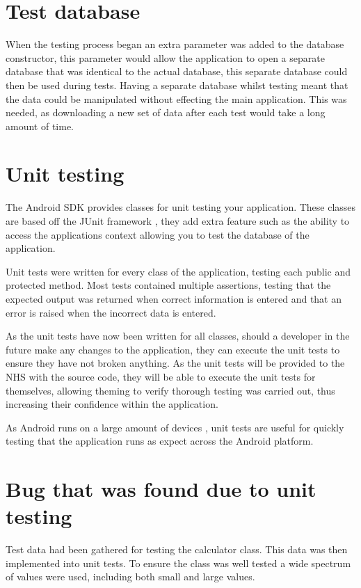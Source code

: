 \section{Test database}

When the testing process began an extra parameter was added to the database constructor, this parameter would allow the application to open a separate database that was identical to the actual database, this separate database could then be used during tests. Having a separate database whilst testing meant that the data could be manipulated without effecting the main application. This was needed, as downloading a new set of data after each test would take a long amount of time.

\section{Unit testing}

The Android SDK \cite{android_sdk} provides classes for unit testing your application. These classes are based off the JUnit framework \cite{junit}, they add extra feature such as the ability to access the applications context allowing you to test the database of the application.

Unit tests \cite{junit} were written for every class of the application, testing each public and protected method. Most tests contained multiple assertions, testing that the expected output was returned when correct information is entered and that an error is raised when the incorrect data is entered.

As the unit tests have now been written for all classes, should a developer in the future make any changes to the application, they can execute the unit tests to ensure they have not broken anything. As the unit tests will be provided to the NHS with the source code, they will be able to execute the unit tests for themselves, allowing theming to verify thorough testing was carried out, thus increasing their confidence within the application.

As Android runs on a large amount of devices \cite{phone_market}, unit tests are useful for quickly testing that the application runs as expect across the Android platform. 


\section{Bug that was found due to unit testing}

Test data had been gathered for testing the calculator class. This data was then implemented into unit tests. To ensure the class was well tested a wide spectrum of values were used, including both small and large values.

